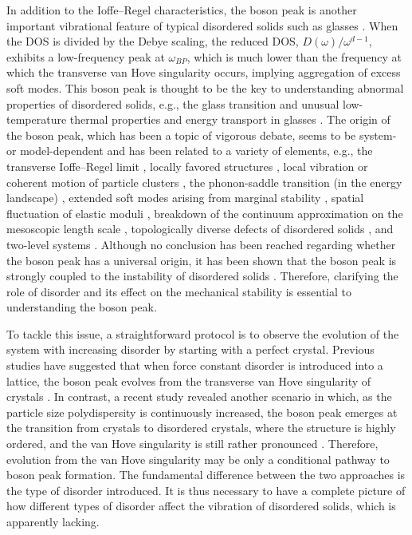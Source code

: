 \documentclass[twocolumn,printnumbers,amsmath,amssymb,prl,verbatim]{revtex4}
\begin{document}
In addition to the Ioffe--Regel characteristics, the boson peak is another important vibrational feature of typical disordered solids such as glasses \cite{nakayama,nakayama1,duval,keyes,schirmacher,kantelhardt,grigera,gurevich,sokolov,wuttke,lunkenheimer}. When the DOS is divided by the Debye scaling, the reduced DOS, $D(\omega)/\omega^{d-1}$, exhibits a low-frequency peak at $\omega_{BP}$, which is much lower than the frequency at which the transverse van Hove singularity occurs, implying aggregation of excess soft modes. This boson peak is thought to be the key to understanding abnormal properties of disordered solids, e.g., the glass transition and unusual low-temperature thermal properties and energy transport in glasses \cite{phillipsbook,xu,wyart}. The origin of the boson peak, which has been a topic of vigorous debate, seems to be system- or model-dependent and has been related to a variety of elements, e.g., the transverse Ioffe--Regel limit \cite{shintani,beltukov}, locally favored structures \cite{tanaka1}, local vibration or coherent motion of particle clusters \cite{duval1,angell1}, the phonon-saddle transition (in the energy landscape) \cite{grigera}, extended soft modes arising from marginal stability \cite{silbert,wyart,degiuli}, spatial fluctuation of elastic moduli \cite{schirmacher1,ferrante}, breakdown of the continuum approximation on the mesoscopic length scale \cite{Fl,monaco}, topologically diverse defects of disordered solids \cite{angell2}, and two-level systems \cite{parashin}. Although no conclusion has been reached regarding whether the boson peak has a universal origin, it has been shown that the boson peak is strongly coupled to the instability of disordered solids \cite{wang,singh}. Therefore, clarifying the role of disorder and its effect on the mechanical stability is essential to understanding the boson peak.

To tackle this issue, a straightforward protocol is to observe the evolution of the system with increasing disorder by starting with a perfect crystal. Previous studies have suggested that when force constant disorder is introduced into a lattice, the boson peak evolves from the transverse van Hove singularity of crystals \cite{chumakov2,schirmacher1,taraskin}. In contrast, a recent study revealed another scenario in which, as the particle size polydispersity is continuously increased, the boson peak emerges at the transition from crystals to disordered crystals, where the structure is highly ordered, and the van Hove singularity is still rather pronounced \cite{huatong}. Therefore, evolution from the van Hove singularity may be only a conditional pathway to boson peak formation. The fundamental difference between the two approaches is the type of disorder introduced. It is thus necessary to have a complete picture of how different types of disorder affect the vibration of disordered solids, which is apparently lacking.
\end{document}
